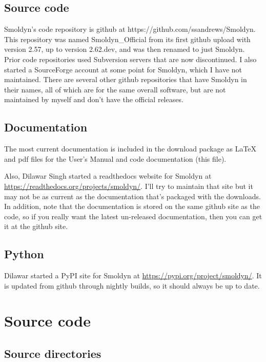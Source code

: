 \documentclass {scrbook}
\begin{document}
\subsection{Source code}

Smoldyn's code repository is github at https://github.com/ssandrews/Smoldyn. This repository was named Smoldyn\_Official from its first github upload with version 2.57, up to version 2.62.dev, and was then renamed to just Smoldyn. Prior code repositories used Subversion servers that are now discontinued. I also started a SourceForge account at some point for Smoldyn, which I have not maintained. There are several other github repositories that have Smoldyn in their names, all of which are for the same overall software, but are not maintained by myself and don't have the official releases.

\subsection{Documentation}

The most current documentation is included in the download package as LaTeX and pdf files for the User's Manual and code documentation (this file).

Also, Dilawar Singh started a readthedocs website for Smoldyn at \url{https://readthedocs.org/projects/smoldyn/}. I'll try to maintain that site but it may not be as current as the documentation that's packaged with the downloads. In addition, note that the documentation is stored on the same github site as the code, so if you really want the latest un-released documentation, then you can get it at the github site.

\subsection{Python}

Dilawar started a PyPI site for Smoldyn at \url{https://pypi.org/project/smoldyn/}. It is updated from github through nightly builds, so it should always be up to date.


\section{Source code}

\subsection{Source directories}
\end{document}
